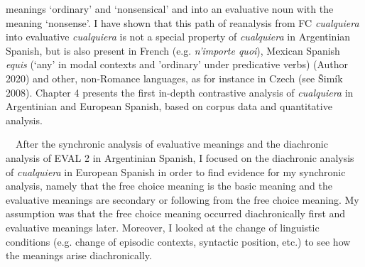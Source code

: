 \documentclass[10pt]{article}
\newenvironment{styleStandard}{\renewcommand\baselinestretch{1.25}\setlength\leftskip{0cm}\setlength\rightskip{0cm}\setlength\parindent{0cm}\setlength\parfillskip{0pt plus 1fil}\setlength\parskip{0in plus 1pt}\writerlistparindent\writerlistleftskip\leavevmode\normalfont\normalsize\fontsize{12pt}{14.4pt}\selectfont\writerlistlabel\ignorespaces}{\unskip\vspace{0in plus 1pt}\par}
\newcommand\writerlistleftskip{}
\newcommand\writerlistparindent{}
\newcommand\writerlistlabel{}
\begin{document}
\begin{styleStandard}
meanings ‘ordinary’ and ‘nonsensical’ and into an evaluative noun with the meaning ‘nonsense’. I have shown that this path of reanalysis from FC \textit{cualquiera} into evaluative \textit{cualquiera }is not a special property of \textit{cualquiera} in Argentinian Spanish, but is also present in French (e.g. \textit{n’importe quoi}), Mexican Spanish \textit{equis} (‘any’ in modal contexts and ’ordinary’ under predicative verbs) (Author 2020) and other, non-Romance languages, as for instance in Czech (see Šimík 2008). Chapter 4 presents the first in-depth contrastive analysis of \textit{cualquiera} in Argentinian and European Spanish, based on corpus data and quantitative analysis. 
\end{styleStandard}

\begin{styleStandard}
\ \ After the synchronic analysis of evaluative meanings and the diachronic analysis of EVAL 2 in Argentinian Spanish, I focused on the diachronic analysis of \textit{cualquiera} in European Spanish in order to find evidence for my synchronic analysis, namely that the free choice meaning is the basic meaning and the evaluative meanings are secondary or following from the free choice meaning. My assumption was that the free choice meaning occurred diachronically first and evaluative meanings later. Moreover, I looked at the change of linguistic conditions (e.g. change of episodic contexts, syntactic position, etc.) to see how the meanings arise diachronically. 
\end{styleStandard}
\end{document}
